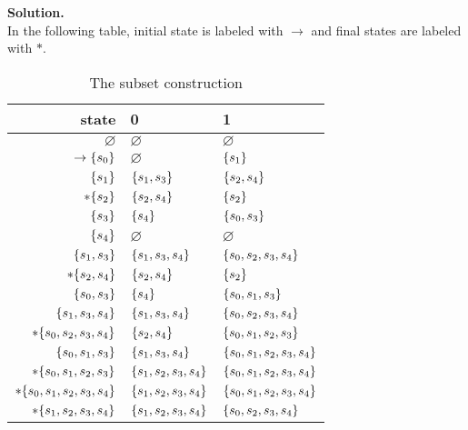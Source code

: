 \textbf{Solution.}\\
In the following table, initial state is labeled with \(\rightarrow\) and final states are labeled with \(*\).
\renewcommand{\arraystretch}{1.2}
\begin{table}[h]
\centering
\begin{tabular}[tb]{r||l|l}
   state & 0 & 1 \\
  \hline
  \(\varnothing\) & \(\varnothing\) & \(\varnothing\) \\

  \(\rightarrow \{s_{0}\}\) & \(\varnothing\) & \(\{s_{1}\}\)\\

  \(\{s_{1}\}\) & \(\{s_{1}, s_{3}\}\) & \(\{s_{2}, s_{4}\}\) \\

  \(*\{s_{2}\}\) & \(\{s_{2}, s_{4}\}\) & \(\{s_{2}\}\) \\

  \(\{s_{3}\}\) & \(\{s_{4}\}\) & \(\{s_{0}, s_{3}\}\) \\

  \(\{s_{4}\}\) & \(\varnothing\) & \(\varnothing\) \\

  \(\{s_{1}, s_{3}\}\) & \(\{s_{1}, s_{3}, s_{4}\}\) & \(\{s_{0}, s_{2}, s_{3}, s_{4}\}\) \\

  \(*\{s_{2}, s_{4}\}\) & \(\{s_{2}, s_{4}\}\) & \(\{s_{2}\}\) \\

  \(\{s_{0}, s_{3}\}\) & \(\{s_{4}\}\) & \(\{s_{0}, s_{1}, s_{3}\}\) \\

  \(\{s_{1}, s_{3}, s_{4}\}\) & \(\{s_{1}, s_{3}, s_{4}\}\) & \(\{s_{0}, s_{2}, s_{3}, s_{4}\}\) \\

  \(*\{s_{0}, s_{2}, s_{3}, s_{4}\}\) & \(\{s_{2}, s_{4}\}\) & \(\{s_{0}, s_{1}, s_{2}, s_{3}\}\) \\

  \(\{s_{0}, s_{1}, s_{3}\}\) & \(\{s_{1}, s_{3}, s_{4}\}\) & \(\{s_{0}, s_{1}, s_{2}, s_{3}, s_{4}\}\) \\

  \(*\{s_{0}, s_{1}, s_{2}, s_{3}\}\) & \(\{s_{1}, s_{2}, s_{3}, s_{4}\}\) & \(\{s_{0}, s_{1}, s_{2}, s_{3}, s_{4}\}\) \\

  \(*\{s_{0}, s_{1}, s_{2}, s_{3}, s_{4}\}\) & \(\{s_{1}, s_{2}, s_{3}, s_{4}\}\) & \(\{s_{0}, s_{1}, s_{2}, s_{3}, s_{4}\}\) \\

  \(*\{s_{1}, s_{2}, s_{3}, s_{4}\}\) & \(\{s_{1}, s_{2}, s_{3}, s_{4}\}\) & \(\{s_{0}, s_{2}, s_{3}, s_{4}\}\) \\
\end{tabular}
\caption{The subset construction}
\end{table}
